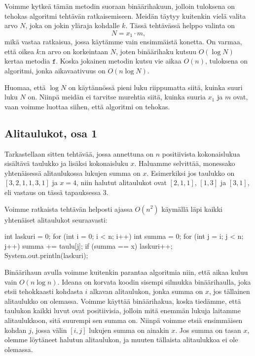Voimme kytkeä tämän metodin suoraan binäärihakuun,
jolloin tuloksena on tehokas algoritmi tehtävän ratkaisemiseen.
Meidän täytyy kuitenkin vielä valita arvo $N$,
joka on jokin yläraja kohdalle $k$.
Tässä tehtävässä helppo valinta on
\[N = x_1 \cdot m,\]
mikä vastaa ratkaisua, jossa käytämme vain ensimmäistä konetta.
On varmaa, että oikea $k$:n arvo on korkeintaan $N$,
joten binäärihaku kutsuu $O(\log N)$ kertaa metodia $\texttt{f}$.
Koska jokainen metodin kutsu vie aikaa $O(n)$,
tuloksena on algoritmi, jonka aikavaativuus on $O(n \log N)$.

Huomaa, että $\log N$ on käytännössä pieni luku riippumatta
siitä, kuinka suuri luku $N$ on.
Niinpä meidän ei tarvitse murehtia siitä,
kuinka suuria $x_1$ ja $m$ ovat,
vaan voimme luottaa siihen, että algoritmi on tehokas.

\subsection{Alitaulukot, osa 1}

Tarkastellaan sitten tehtävää, jossa annettuna on $n$
positiivista kokonaislukua sisältävä taulukko ja lisäksi kokonaisluku $x$.
Haluamme selvittää, monessako yhtenäisessä alitaulukossa
lukujen summa on $x$.
Esimerkiksi jos taulukko on $[3,2,1,1,3,1]$ ja $x=4$,
niin halutut alitaulukot ovat $[2,1,1]$, $[1,3]$ ja $[3,1]$,
eli vastaus on tässä tapauksessa $3$.

Voimme ratkaista tehtävän helposti ajassa $O(n^2)$
käymällä läpi kaikki yhtenäiset alitaulukot seuraavasti:

\begin{code}
int laskuri = 0;
for (int i = 0; i < n; i++) {
    int summa = 0;
    for (int j = i; j < n; j++) {
        summa += taulu[j];
        if (summa == x) laskuri++;
    }
}
System.out.println(laskuri);
\end{code}

Binäärihaun avulla voimme kuitenkin parantaa algoritmia niin,
että aikaa kuluu vain $O(n \log n)$.
Ideana on korvata koodin sisempi silmukka
binääri\-haulla, joka etsii tehokkaasti kohdasta $i$
alkavan alitaulukon, jonka summa on $x$, jos tällainen alitaulukko on olemassa.
Voimme käyttää binäärihakua, koska tiedämme, että taulukon kaikki
luvut ovat positiivisia, jolloin mitä enemmän lukuja laitamme alitaulukkoon,
sitä suurempi sen summa on.
Niinpä voimme etsiä ensimmäisen kohdan $j$,
jossa välin $[i,j]$ lukujen summa on ainakin $x$.
Jos summa on tasan $x$, olemme löytäneet halutun alitaulukon,
ja muuten tällaista alitaulukkoa ei ole olemassa.

